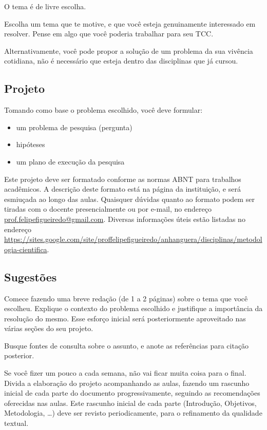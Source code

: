 \documentclass[a4paper]{article}
\begin{document}
O tema é de livre escolha.

Escolha um tema que te motive, e que você esteja genuinamente interessado em resolver.
Pense em algo que você poderia trabalhar para seu TCC.

Alternativamente, você pode propor a solução de um problema da sua vivência cotidiana, não é necessário que esteja dentro das disciplinas que já cursou.

\subsection{Projeto}

Tomando como base o problema escolhido, você deve formular:

\begin{itemize}
\item um problema de pesquisa (pergunta)
\item hipóteses
\item um plano de execução da pesquisa
\end{itemize}

Este projeto deve ser formatado conforme as normas ABNT para trabalhos acadêmicos.
A descrição deste formato está na página da instituição, e será esmiuçada ao longo das aulas.
Quaisquer dúvidas quanto ao formato podem ser tiradas com o docente presencialmente ou por e-mail, no endereço \url{prof.felipefigueiredo@gmail.com}.
Diversas informações úteis estão listadas no endereço \url{https://sites.google.com/site/proffelipefigueiredo/anhanguera/disciplinas/metodologia-cientifica}.

\subsection{Sugestões}

Comece fazendo uma breve redação (de 1 a 2 páginas) sobre o tema que você escolheu.
Explique o contexto do problema escolhido e justifique a importância da resolução do mesmo.
Esse esforço inicial será posteriormente aproveitado nas várias seções do seu projeto.

Busque fontes de consulta sobre o assunto, e anote as referências para citação posterior.

Se você fizer um pouco a cada semana, não vai ficar muita coisa para o final.
Divida a elaboração do projeto acompanhando as aulas, fazendo um rascunho inicial de cada parte do documento progressivamente, seguindo as recomendações oferecidas nas aulas.
Este rascunho inicial de cada parte (Introdução, Objetivos, Metodologia, \ldots) deve ser revisto periodicamente, para o refinamento da qualidade textual.
\end{document}
